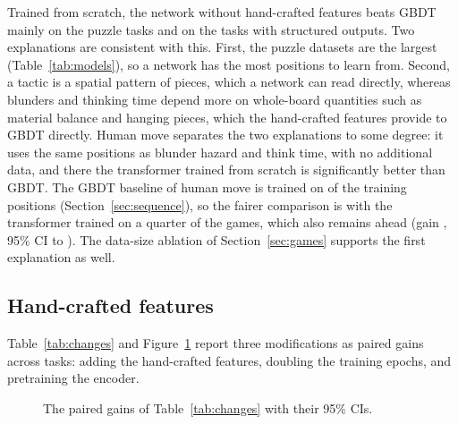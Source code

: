 \documentclass[11pt]{article}
\begin{document}
Trained from scratch, the network without hand-crafted features beats GBDT
mainly on the puzzle tasks and on the tasks with structured outputs. Two
explanations are consistent with this. First, the puzzle datasets are the
largest (Table~\ref{tab:models}), so a network has the most positions to
learn from. Second, a tactic is a spatial pattern of pieces, which a network
can read directly, whereas blunders and thinking time depend more on
whole-board quantities such as material balance and hanging pieces, which
the hand-crafted features provide to GBDT directly. Human move separates the
two explanations to some degree: it uses the same positions as blunder
hazard and think time, with no additional data, and there the transformer
trained from scratch is significantly better than GBDT. The GBDT baseline of
human move is trained on  of the
 training positions
(Section~\ref{sec:sequence}), so the fairer comparison is with the transformer
trained on a quarter of the games, which also remains ahead (gain
, 95\% CI
 to
). The data-size
ablation of Section~\ref{sec:games} supports the first explanation as well.

\subsection{Hand-crafted features}
\label{sec:features}

Table~\ref{tab:changes} and Figure~\ref{fig:changes} report three
modifications as paired gains across tasks: adding the hand-crafted features,
doubling the training epochs, and pretraining the encoder.

\begin{table}[htbp]\centering\small
{}
\caption{Paired gain of a modified model over the unmodified model named in
the column head, by task, in points of normalised score with the 95\% CI.
Gains in bold are statistically significant. The paper of each task reports
the same gains in the task's own metric.}
\label{tab:changes}
\end{table}

\begin{figure}[htbp]\centering
{}
\caption{The paired gains of Table~\ref{tab:changes} with their 95\% CIs.}
\label{fig:changes}
\end{figure}
\end{document}
